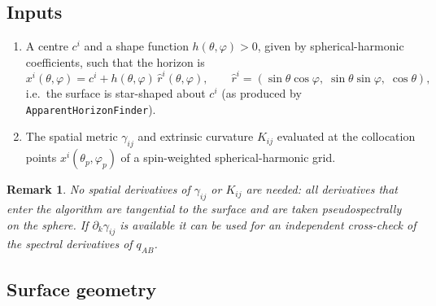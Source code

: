 \documentclass[11pt]{article}
\newtheorem{remark}{Remark}
\begin{document}
\subsection{Inputs}
\label{sec:inputs}

\begin{enumerate}
\item A centre $c^i$ and a shape function $h(\theta,\varphi)>0$, given by
  spherical-harmonic coefficients, such that the horizon is
  \begin{equation}
    x^i(\theta,\varphi) = c^i + h(\theta,\varphi)\,\hat r^i(\theta,\varphi),
    \qquad
    \hat r^i = (\sin\theta\cos\varphi,\;\sin\theta\sin\varphi,\;\cos\theta),
    \label{eq:embedding}
  \end{equation}
  i.e.\ the surface is star-shaped about $c^i$ (as produced by
  \texttt{ApparentHorizonFinder}).
\item The spatial metric $\gamma_{ij}$ and extrinsic curvature $K_{ij}$
  evaluated at the collocation points $x^i(\theta_p,\varphi_p)$ of a
  spin-weighted spherical-harmonic grid.
\end{enumerate}

\begin{remark}
No spatial \emph{derivatives} of $\gamma_{ij}$ or $K_{ij}$ are needed:
all derivatives that enter the algorithm are tangential to the surface and are
taken pseudospectrally on the sphere.  If $\partial_k\gamma_{ij}$ is available
it can be used for an independent cross-check of the spectral derivatives of
$q_{AB}$.
\end{remark}

\subsection{Surface geometry}
\label{sec:surface}
\end{document}
